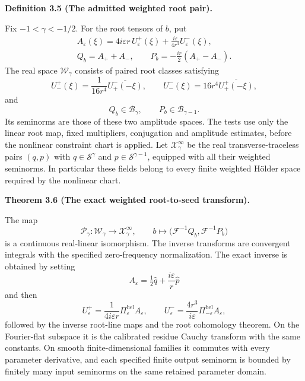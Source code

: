 \documentclass[
  english,
  11pt,
  reqno]{amsart}
\makeatletter
\newcommand{\pandocstatementheading}[1]{%
  \par\if@nobreak\else
    \addpenalty{\@beginparpenalty}%
    \addvspace{.5\baselineskip plus .2\baselineskip minus .2\baselineskip}%
  \fi
  {\normalfont\bfseries #1\par}%
  \nobreak\@afterindenttrue\@afterheading
}
\makeatother
\begin{document}
\pandocstatementheading{\leavevmode{}\label{def:online-weighted-root-domain}Definition 3.5 (The admitted weighted root pair).}

Fix \(-1<\gamma<-1/2\). For the root tensors of \(b\), put%
 \[
\begin{aligned}
A_\varepsilon(\xi)
 =4i\varepsilon r\,U^+_\varepsilon(\xi)
 +\frac{i\varepsilon}{4r^3}U^-_\varepsilon(\xi),\\
Q_b=A_++A_-,\qquad
P_b=-\frac{ir}{2}(A_+-A_-).
\end{aligned}
\] The real space \(\mathscr W_\gamma\) consists of paired root classes
satisfying%
 \[
U^+_-(\xi)=\frac1{16r^4}\overline{U^-_+(-\xi)},
\qquad
U^-_-(\xi)=16r^4\overline{U^+_+(-\xi)},
\] and%
 \[
Q_b\in\mathscr B_\gamma,
\qquad
P_b\in\mathscr B_{\gamma-1}.
\] Its seminorms are those of these two amplitude spaces. The tests use
only the linear root map, fixed multipliers, conjugation and amplitude
estimates, before the nonlinear constraint chart is applied. Let
\(\mathcal X^\infty_\gamma\) be the real transverse-traceless pairs
\((q,p)\) with \(q\in\mathscr S^\gamma\) and
\(p\in\mathscr S^{\gamma-1}\), equipped with all their weighted
seminorms. In particular these fields belong to every finite weighted
Hölder space required by the nonlinear chart.

\pandocstatementheading{\leavevmode{}\label{thm:online-root-seed-isomorphism}Theorem 3.6 (The exact weighted root-to-seed transform).}

The map%
 \[
\mathscr P_\gamma:\mathscr W_\gamma\longrightarrow\mathcal X^\infty_\gamma,
\qquad
b\longmapsto\bigl(\mathcal F^{-1}Q_b,\mathcal F^{-1}P_b\bigr)
\] is a continuous real-linear isomorphism. The inverse transforms are
convergent integrals with the specified zero-frequency normalization.
The exact inverse is obtained by setting \[
A_\varepsilon=\tfrac12\widehat q+\frac{i\varepsilon}{r}\widehat p
\] and then%
 \[
U^+_\varepsilon
=\frac1{4i\varepsilon r}\Pi^{\mathrm{hel}}_\varepsilon A_\varepsilon,
\qquad
U^-_\varepsilon
=\frac{4r^3}{i\varepsilon}\Pi^{\mathrm{hel}}_{-\varepsilon}A_\varepsilon,
\] followed by the inverse root-line maps and the root cohomology
theorem. On the Fourier-flat subspace it is the calibrated residue
Cauchy transform with the same constants. On smooth finite-dimensional
families it commutes with every parameter derivative, and each specified
finite output seminorm is bounded by finitely many input seminorms on
the same retained parameter domain.
\end{document}
